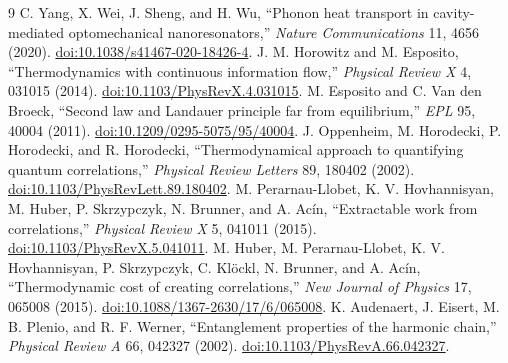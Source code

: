 \documentclass[9pt]{article}
\begin{document}
\begin{thebibliography}{9}
 C. Yang, X. Wei, J. Sheng, and H. Wu, ``Phonon heat transport in cavity-mediated optomechanical nanoresonators,'' \emph{Nature Communications} 11, 4656 (2020). \href{https://doi.org/10.1038/s41467-020-18426-4}{doi:10.1038/s41467-020-18426-4}.
 J. M. Horowitz and M. Esposito, ``Thermodynamics with continuous information flow,'' \emph{Physical Review X} 4, 031015 (2014). \href{https://doi.org/10.1103/PhysRevX.4.031015}{doi:10.1103/PhysRevX.4.031015}.
 M. Esposito and C. Van den Broeck, ``Second law and Landauer principle far from equilibrium,'' \emph{EPL} 95, 40004 (2011). \href{https://doi.org/10.1209/0295-5075/95/40004}{doi:10.1209/0295-5075/95/40004}.
 J. Oppenheim, M. Horodecki, P. Horodecki, and R. Horodecki, ``Thermodynamical approach to quantifying quantum correlations,'' \emph{Physical Review Letters} 89, 180402 (2002). \href{https://doi.org/10.1103/PhysRevLett.89.180402}{doi:10.1103/PhysRevLett.89.180402}.
 M. Perarnau-Llobet, K. V. Hovhannisyan, M. Huber, P. Skrzypczyk, N. Brunner, and A. Ac\'in, ``Extractable work from correlations,'' \emph{Physical Review X} 5, 041011 (2015). \href{https://doi.org/10.1103/PhysRevX.5.041011}{doi:10.1103/PhysRevX.5.041011}.
 M. Huber, M. Perarnau-Llobet, K. V. Hovhannisyan, P. Skrzypczyk, C. Kl\"ockl, N. Brunner, and A. Ac\'in, ``Thermodynamic cost of creating correlations,'' \emph{New Journal of Physics} 17, 065008 (2015). \href{https://doi.org/10.1088/1367-2630/17/6/065008}{doi:10.1088/1367-2630/17/6/065008}.
 K. Audenaert, J. Eisert, M. B. Plenio, and R. F. Werner, ``Entanglement properties of the harmonic chain,'' \emph{Physical Review A} 66, 042327 (2002). \href{https://doi.org/10.1103/PhysRevA.66.042327}{doi:10.1103/PhysRevA.66.042327}.
\end{thebibliography}
\end{document}
